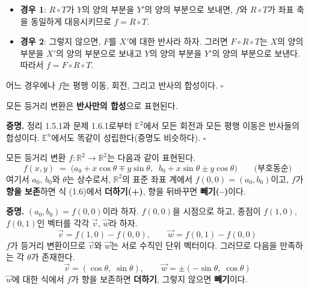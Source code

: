 \documentclass{article}
\begin{document}
\begin{itemize}\setlength\itemsep{2pt}
  \item \textbf{경우 1}: $R \circ T$가 $Y$의 양의 부분을 $Y'$의 양의 부분으로 보내면,
    $f$와 $R \circ T$가 좌표 축을 동일하게 대응시키므로 $f = R \circ T$.

  \item \textbf{경우 2}: 그렇지 않으면,
    $F$를 $X'$에 대한 반사라 하자.
    그러면 $F \circ R \circ T$는 $X$의 양의 부분을 $X'$의 양의 부분으로 보내고
    $Y$의 양의 부분을 $Y'$의 양의 부분으로 보낸다.
    따라서 $f = F \circ R \circ T$.
\end{itemize}

어느 경우에나 $f$는 평행 이동, 회전, 그리고 반사의 합성이다.
\hfill $\square$

\begin{tcolorbox}[
  colback=red!4, colframe=red!60!black,
  title=따름정리 1.10.1,
  fonttitle=\bfseries, boxrule=0.5mm, arc=3mm]

모든 등거리 변환은 \textbf{반사만의 합성}으로 표현된다.

\end{tcolorbox}

\textbf{증명.}\quad
정리 1.5.1과 문제 1.6.1로부터 $\mathbb{E}^2$에서 모든 회전과 모든 평행 이동은 반사들의 합성이다.
$\mathbb{E}^n$에서도 똑같이 성립한다(증명도 비슷하다).
\hfill $\square$

\bigskip

\begin{tcolorbox}[
  colback=red!4, colframe=red!60!black,
  title=따름정리 1.10.2\quad ($\mathbb{R}^2$에서의 일반적인 등거리 변환 공식),
  fonttitle=\bfseries, boxrule=0.5mm, arc=3mm]

모든 등거리 변환 $f : \mathbb{R}^2 \to \mathbb{R}^2$는 다음과 같이 표현된다.
\[
  f(x, y) \;=\;
  \bigl(a_0 + x\cos\theta \mp y\sin\theta,\;\;
        b_0 + x\sin\theta \pm y\cos\theta\bigr)
  \qquad \text{(부호동순)} \tag{1.6}
\]
여기서 $a_0,\, b_0$와 $\theta$는 상수로서, $\mathbb{R}^2$의 표준 좌표 계에서
$f(0,0) = (a_0, b_0)$이고,
$f$가 \textbf{향을 보존}하면 식 (1.6)에서 \textbf{더하기(+)}, 향을 뒤바꾸면 \textbf{빼기(--)}이다.

\end{tcolorbox}

\textbf{증명.}\quad
$(a_0, b_0) = f(0,0)$이라 하자.
$f(0,0)$을 시점으로 하고, 종점이 $f(1,0)$, $f(0,1)$인 벡터를 각각 $\vec{v}$, $\vec{w}$라 하자.
\[
  \vec{v} = f(1,0) - f(0,0), \qquad \vec{w} = f(0,1) - f(0,0)
\]
$f$가 등거리 변환이므로 $\vec{v}$와 $\vec{w}$는 서로 수직인 단위 벡터이다.
그러므로 다음을 만족하는 각 $\theta$가 존재한다.
\[
  \vec{v} = (\cos\theta,\; \sin\theta), \qquad
  \vec{w} = \pm(-\sin\theta,\; \cos\theta) \tag{1.7}
\]
$\vec{w}$에 대한 식에서 $f$가 향을 보존하면 \textbf{더하기}, 그렇지 않으면 \textbf{빼기}이다.
\end{document}
